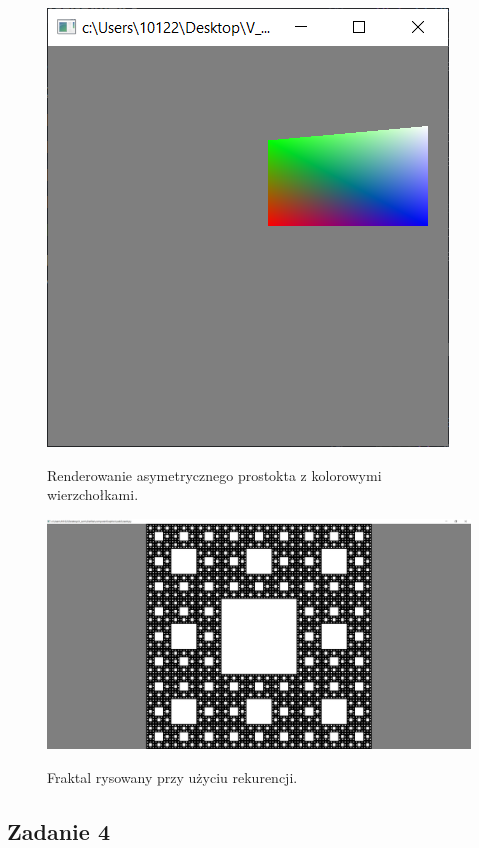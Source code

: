 \documentclass[a4paper, 12pt]{article}
\begin{document}
\begin{figure}[h]
    \centering
    \begin{minipage}[t]{0.4\textwidth}
        \centering
        \label{fig:zad3}
        \includegraphics[height=0.25\textheight]{zad3.png}
        \caption{Renderowanie asymetrycznego prostokta z kolorowymi wierzchołkami.}
    \end{minipage}
    \hfill
    \begin{minipage}[t]{0.58\textwidth}
        \centering
        \label{fig:zad4}
        \includegraphics[height=0.25\textheight]{zad4.png}
        \caption{Fraktal rysowany przy użyciu rekurencji.}
    \end{minipage}
\end{figure}


\subsection{Zadanie 4}
\end{document}
